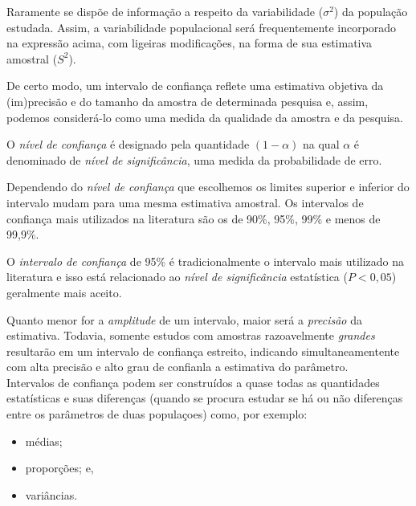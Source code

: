 \documentclass[
]{book}
\providecommand{\tightlist}{%
  \setlength{\itemsep}{0pt}\setlength{\parskip}{0pt}}
\begin{document}
\hfill\break

Raramente se dispõe de informação a respeito da variabilidade (\(\sigma^{2}\)) da população estudada. Assim, a variabilidade populacional será frequentemente incorporado na expressão acima, com ligeiras modificações, na forma de sua estimativa amostral (\(S^{2}\)).

\hfill\break

De certo modo, um intervalo de confiança reflete uma estimativa objetiva da (im)precisão e do tamanho da amostra de determinada pesquisa e, assim, podemos considerá-lo como uma medida da qualidade da amostra e da pesquisa.

\hfill\break

O \emph{nível de confiança} é designado pela quantidade \((1-\alpha)\) na qual \(\alpha\) é denominado de \emph{nível de significância}, uma medida da probabilidade de erro.

\hfill\break

Dependendo do \emph{nível de confiança} que escolhemos os limites superior e inferior do intervalo mudam para uma mesma estimativa amostral. Os intervalos de confiança mais utilizados na literatura são os de 90\%, 95\%, 99\% e menos de 99,9\%.

\hfill\break

O \emph{intervalo de confiança} de 95\% é tradicionalmente o intervalo mais utilizado na literatura e isso está relacionado ao \emph{nível de significância} estatística (\(P<0,05\)) geralmente mais aceito.

\hfill\break

Quanto menor for a \emph{amplitude} de um intervalo, maior será a \emph{precisão} da estimativa. Todavia, somente estudos com amostras razoavelmente \emph{grandes} resultarão em um intervalo de confiança estreito, indicando simultaneamentente com alta precisão e alto grau de confianla a estimativa do parâmetro.\\

Intervalos de confiança podem ser construídos a quase todas as quantidades estatísticas e suas diferenças (quando se procura estudar se há ou não diferenças entre os parâmetros de duas populaçoes) como, por exemplo:\\

\begin{itemize}
\tightlist
\item
  médias;
\item
  proporções; e,
\item
  variâncias.
\end{itemize}
\end{document}
